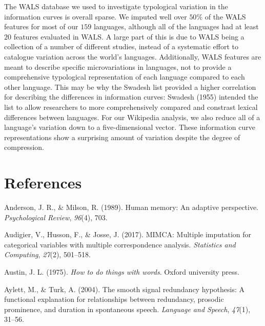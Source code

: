 \documentclass[man,floatsintext]{apa6}
\begin{document}
The WALS database we used to investigate typological variation in the information curves is overall sparse. We imputed well over \(50\%\) of the WALS features for most of our \(159\) languages, although all of the languages had at least \(20\) features evaluated in WALS. A large part of this is due to WALS being a collection of a number of different studies, instead of a systematic effort to catalogue variation across the world's languages. Additionally, WALS features are meant to describe specific microvariations in languages, not to provide a comprehensive typological representation of each language compared to each other language. This may be why the Swadesh list provided a higher correlation for describing the differences in information curves: Swadesh (1955) intended the list to allow researchers to more comprehensively compared and constrast lexical differences between languages. For our Wikipedia analysis, we also reduce all of a language's variation down to a five-dimensional vector. These information curve representations show a surprising amount of variation despite the degree of compression.

\newpage

\hypertarget{references}{%
\section{References}\label{references}}

\begingroup
\setlength{\parindent}{-0.5in}
\setlength{\leftskip}{0.5in}

\hypertarget{refs}{}
\leavevmode\hypertarget{ref-anderson1989}{}%
Anderson, J. R., \& Milson, R. (1989). Human memory: An adaptive perspective. \emph{Psychological Review}, \emph{96}(4), 703.

\leavevmode\hypertarget{ref-audigier2017}{}%
Audigier, V., Husson, F., \& Josse, J. (2017). MIMCA: Multiple imputation for categorical variables with multiple correspondence analysis. \emph{Statistics and Computing}, \emph{27}(2), 501--518.

\leavevmode\hypertarget{ref-austin1975}{}%
Austin, J. L. (1975). \emph{How to do things with words}. Oxford university press.

\leavevmode\hypertarget{ref-aylett2004}{}%
Aylett, M., \& Turk, A. (2004). The smooth signal redundancy hypothesis: A functional explanation for relationships between redundancy, prosodic prominence, and duration in spontaneous speech. \emph{Language and Speech}, \emph{47}(1), 31--56.
\end{document}
